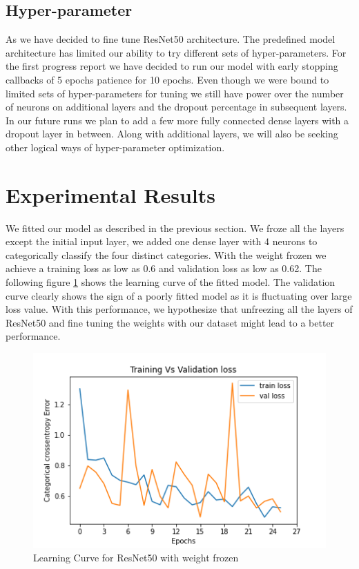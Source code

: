 \documentclass{report}
\begin{document}
\subsection{Hyper-parameter}
As we have decided to fine tune ResNet50 architecture. The predefined model architecture has limited our ability to try different sets of hyper-parameters. For the first progress report we have decided to run our model with early stopping callbacks of 5 epochs patience for 10 epochs. Even though we were bound to limited sets of hyper-parameters for tuning we still have power over the number of neurons on additional layers and the dropout percentage in subsequent layers. In our future runs we plan to add a few more fully connected dense layers with a dropout layer in between. Along with additional layers, we will also be seeking other logical ways of hyper-parameter optimization. 



\section{Experimental Results}
We fitted our model as described in the previous section. We froze all the layers except the initial input layer, we added one dense layer with 4 neurons to categorically classify the four distinct categories. With the weight frozen we achieve a training loss as low as 0.6 and validation loss as low as 0.62. The following figure \ref{fig:Frozen} shows the learning curve of the fitted model. The validation curve clearly shows the sign of a poorly fitted model as it is fluctuating over large loss value. With this performance, we hypothesize that unfreezing all the layers of ResNet50 and fine tuning the weights with our dataset might lead to a better performance. 

\begin{figure}[H]
\centering
\includegraphics[width=\textwidth]{LossVal_lossR50Freeze.png}
\caption{Learning Curve for ResNet50 with weight frozen}
\label{fig:Frozen}
\end{figure}
\end{document}
